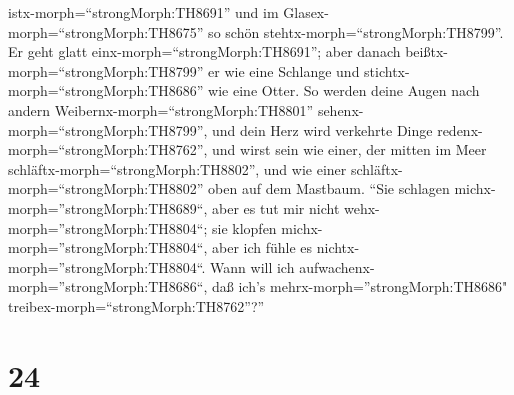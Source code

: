 istx-morph=``strongMorph:TH8691'' und im
Glasex-morph=``strongMorph:TH8675'' so schön
stehtx-morph=``strongMorph:TH8799''. Er geht glatt
einx-morph=``strongMorph:TH8691'';  aber danach
beißtx-morph=``strongMorph:TH8799'' er wie eine Schlange und
stichtx-morph=``strongMorph:TH8686'' wie eine Otter.  So
werden deine Augen nach andern Weibernx-morph=``strongMorph:TH8801''
sehenx-morph=``strongMorph:TH8799'', und dein Herz wird verkehrte Dinge
redenx-morph=``strongMorph:TH8762'',  und wirst sein wie
einer, der mitten im Meer schläftx-morph=``strongMorph:TH8802'', und wie
einer schläftx-morph=``strongMorph:TH8802'' oben auf dem Mastbaum.
 ``Sie schlagen michx-morph=''strongMorph:TH8689``, aber es
tut mir nicht wehx-morph=''strongMorph:TH8804``; sie klopfen
michx-morph=''strongMorph:TH8804``, aber ich fühle es
nichtx-morph=''strongMorph:TH8804``. Wann will ich
aufwachenx-morph=''strongMorph:TH8686``, daß ich's
mehrx-morph=''strongMorph:TH8686"
treibex-morph=``strongMorph:TH8762''?''

\hypertarget{section-23}{%
\section{24}\label{section-23}}

